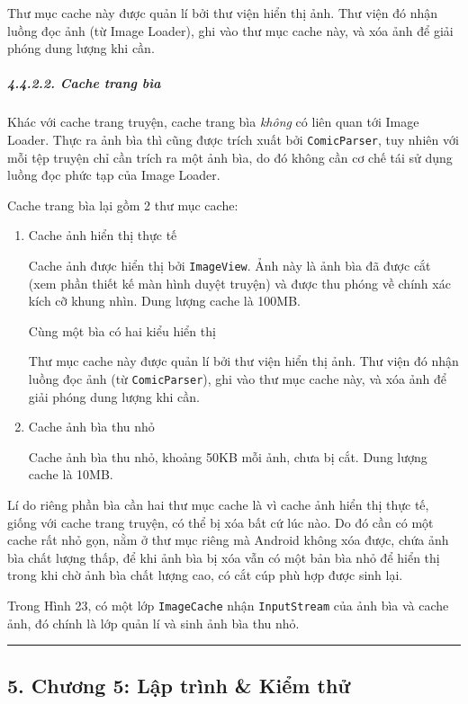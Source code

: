 \documentclass[
]{article}
\begin{document}
Thư mục cache này được quản lí bởi thư viện hiển thị ảnh. Thư viện đó
nhận luồng đọc ảnh (từ Image Loader), ghi vào thư mục cache này, và xóa
ảnh để giải phóng dung lượng khi cần.

\hypertarget{cache-trang-buxeca}{%
\subparagraph{4.4.2.2. Cache trang bìa}\label{cache-trang-buxeca}}

Khác với cache trang truyện, cache trang bìa \emph{không} có liên quan
tới Image Loader. Thực ra ảnh bìa thì cũng được trích xuất bởi
\texttt{ComicParser}, tuy nhiên với mỗi tệp truyện chỉ cần trích ra một
ảnh bìa, do đó không cần cơ chế tái sử dụng luồng đọc phức tạp của Image
Loader.

Cache trang bìa lại gồm 2 thư mục cache:

\begin{enumerate}
\def\labelenumi{\arabic{enumi}.}
\item
  Cache ảnh hiển thị thực tế

  Cache ảnh được hiển thị bởi \texttt{ImageView}. Ảnh này là ảnh bìa đã
  được cắt (xem phần thiết kế màn hình duyệt truyện) và được thu phóng
  về chính xác kích cỡ khung nhìn. Dung lượng cache là 100MB.

  Cùng một bìa có hai kiểu hiển thị

  Thư mục cache này được quản lí bởi thư viện hiển thị ảnh. Thư viện đó
  nhận luồng đọc ảnh (từ \texttt{ComicParser}), ghi vào thư mục cache
  này, và xóa ảnh để giải phóng dung lượng khi cần.
\item
  Cache ảnh bìa thu nhỏ

  Cache ảnh bìa thu nhỏ, khoảng 50KB mỗi ảnh, chưa bị cắt. Dung lượng
  cache là 10MB.
\end{enumerate}

Lí do riêng phần bìa cần hai thư mục cache là vì cache ảnh hiển thị thực
tế, giống với cache trang truyện, có thể bị xóa bất cứ lúc nào. Do đó
cần có một cache rất nhỏ gọn, nằm ở thư mục riêng mà Android không xóa
được, chứa ảnh bìa chất lượng thấp, để khi ảnh bìa bị xóa vẫn có một bản
bìa nhỏ để hiển thị trong khi chờ ảnh bìa chất lượng cao, có cắt cúp phù
hợp được sinh lại.

Trong Hình 23, có một lớp \texttt{ImageCache} nhận \texttt{InputStream}
của ảnh bìa và cache ảnh, đó chính là lớp quản lí và sinh ảnh bìa thu
nhỏ.

\begin{center}\rule{0.5\linewidth}{0.5pt}\end{center}

\hypertarget{chux1b0ux1a1ng-5-lux1eadp-truxecnh-kiux1ec3m-thux1eed}{%
\subsection{\texorpdfstring{5. Chương 5: Lập trình \& Kiểm thử
}{5. Chương 5: Lập trình \& Kiểm thử }}\label{chux1b0ux1a1ng-5-lux1eadp-truxecnh-kiux1ec3m-thux1eed}}
\end{document}
